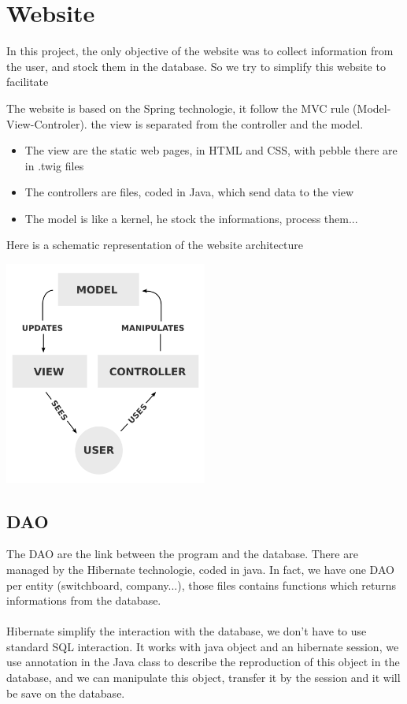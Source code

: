 \chapter{Website}

In this project, the only objective of the website was to collect information from the user, and stock them in the database.
So we try to simplify this website to facilitate 


The website is based on the Spring technologie,  it follow the MVC rule (Model-View-Controler). the view is separated from the controller and the model.

\begin{itemize}  
\item The view are the static web pages, in HTML and CSS, with pebble there are in .twig files
\item The controllers are files, coded in Java, which send data to the view
\item The model is like a kernel, he stock the informations, process them...

\end{itemize}  

Here is a schematic representation of the website architecture

\includegraphics[width=0.50\textwidth]{img/mvc.png}



\section{DAO}

The DAO are the link between the program and the database. There are managed by the Hibernate technologie, coded in java.
In fact, we have one DAO per entity (switchboard, company...), those files contains functions which returns informations from the database.
\\
\\
Hibernate simplify the interaction with the database, we don't have to use standard SQL interaction.
It works with java object and an hibernate session, we use annotation in the Java class to describe the reproduction of this object in the database,
and we can manipulate this object, transfer it by the session and it will be save on the database.



